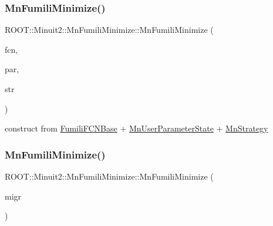 \subsubsection{\texorpdfstring{MnFumiliMinimize()}{MnFumiliMinimize()}\hspace{0.1cm}{\footnotesize\ttfamily [13/14]}}
{\footnotesize\ttfamily R\+O\+O\+T\+::\+Minuit2\+::\+Mn\+Fumili\+Minimize\+::\+Mn\+Fumili\+Minimize (\begin{DoxyParamCaption}\item[{const \mbox{\hyperlink{classROOT_1_1Minuit2_1_1FumiliFCNBase}{Fumili\+F\+C\+N\+Base}} \&}]{fcn,  }\item[{const \mbox{\hyperlink{classROOT_1_1Minuit2_1_1MnUserParameterState}{Mn\+User\+Parameter\+State}} \&}]{par,  }\item[{const \mbox{\hyperlink{classROOT_1_1Minuit2_1_1MnStrategy}{Mn\+Strategy}} \&}]{str }\end{DoxyParamCaption})\hspace{0.3cm}{\ttfamily [inline]}}



construct from \mbox{\hyperlink{classROOT_1_1Minuit2_1_1FumiliFCNBase}{Fumili\+F\+C\+N\+Base}} + \mbox{\hyperlink{classROOT_1_1Minuit2_1_1MnUserParameterState}{Mn\+User\+Parameter\+State}} + \mbox{\hyperlink{classROOT_1_1Minuit2_1_1MnStrategy}{Mn\+Strategy}} 

\mbox{\label{classROOT_1_1Minuit2_1_1MnFumiliMinimize_a082eb87753b71a4d383ff8d735dc8410}} 
\subsubsection{\texorpdfstring{MnFumiliMinimize()}{MnFumiliMinimize()}\hspace{0.1cm}{\footnotesize\ttfamily [14/14]}}
{\footnotesize\ttfamily R\+O\+O\+T\+::\+Minuit2\+::\+Mn\+Fumili\+Minimize\+::\+Mn\+Fumili\+Minimize (\begin{DoxyParamCaption}\item[{const \mbox{\hyperlink{classROOT_1_1Minuit2_1_1MnFumiliMinimize}{Mn\+Fumili\+Minimize}} \&}]{migr }\end{DoxyParamCaption})\hspace{0.3cm}{\ttfamily [inline]}}

